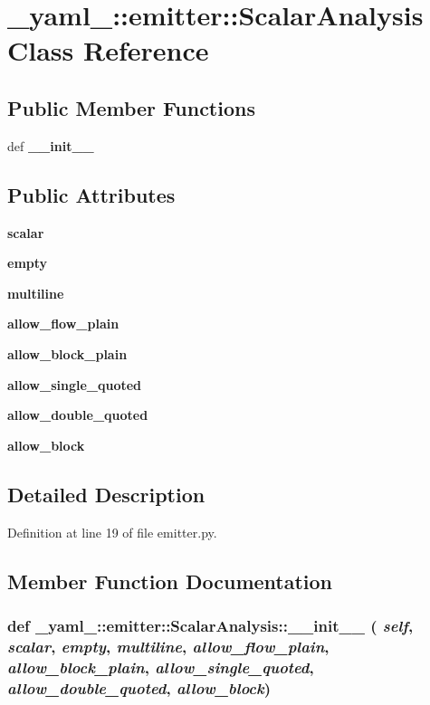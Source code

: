 \section{\_\-yaml\_\-::emitter::ScalarAnalysis Class Reference}
\label{class__yaml___1_1emitter_1_1ScalarAnalysis}
\subsection*{Public Member Functions}
\begin{CompactItemize}
\item 
def {\bf \_\-\_\-init\_\-\_\-}
\end{CompactItemize}
\subsection*{Public Attributes}
\begin{CompactItemize}
\item 
{\bf scalar}
\item 
{\bf empty}
\item 
{\bf multiline}
\item 
{\bf allow\_\-flow\_\-plain}
\item 
{\bf allow\_\-block\_\-plain}
\item 
{\bf allow\_\-single\_\-quoted}
\item 
{\bf allow\_\-double\_\-quoted}
\item 
{\bf allow\_\-block}
\end{CompactItemize}


\subsection{Detailed Description}


Definition at line 19 of file emitter.py.

\subsection{Member Function Documentation}
\subsubsection{\setlength{\rightskip}{0pt plus 5cm}def \_\-yaml\_\-::emitter::ScalarAnalysis::\_\-\_\-init\_\-\_\- ( {\em self},  {\em scalar},  {\em empty},  {\em multiline},  {\em allow\_\-flow\_\-plain},  {\em allow\_\-block\_\-plain},  {\em allow\_\-single\_\-quoted},  {\em allow\_\-double\_\-quoted},  {\em allow\_\-block})}\label{class__yaml___1_1emitter_1_1ScalarAnalysis_4e31f64ae879d42d6209049362dc0bed}




